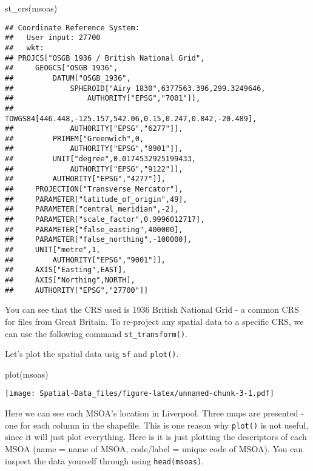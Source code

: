 \documentclass[
]{book}
\newenvironment{Shaded}{\begin{snugshade}}{\end{snugshade}}
\newcommand{\FunctionTok}[1]{\textcolor[rgb]{0.00,0.00,0.00}{#1}}
\newcommand{\NormalTok}[1]{#1}
\begin{document}
\begin{Shaded}
\begin{Highlighting}[]
\FunctionTok{st\_crs}\NormalTok{(msoas)}
\end{Highlighting}
\end{Shaded}

\begin{verbatim}
## Coordinate Reference System:
##   User input: 27700 
##   wkt:
## PROJCS["OSGB 1936 / British National Grid",
##     GEOGCS["OSGB 1936",
##         DATUM["OSGB_1936",
##             SPHEROID["Airy 1830",6377563.396,299.3249646,
##                 AUTHORITY["EPSG","7001"]],
##             TOWGS84[446.448,-125.157,542.06,0.15,0.247,0.842,-20.489],
##             AUTHORITY["EPSG","6277"]],
##         PRIMEM["Greenwich",0,
##             AUTHORITY["EPSG","8901"]],
##         UNIT["degree",0.0174532925199433,
##             AUTHORITY["EPSG","9122"]],
##         AUTHORITY["EPSG","4277"]],
##     PROJECTION["Transverse_Mercator"],
##     PARAMETER["latitude_of_origin",49],
##     PARAMETER["central_meridian",-2],
##     PARAMETER["scale_factor",0.9996012717],
##     PARAMETER["false_easting",400000],
##     PARAMETER["false_northing",-100000],
##     UNIT["metre",1,
##         AUTHORITY["EPSG","9001"]],
##     AXIS["Easting",EAST],
##     AXIS["Northing",NORTH],
##     AUTHORITY["EPSG","27700"]]
\end{verbatim}

You can see that the CRS used is 1936 British National Grid - a common CRS for files from Great Britain. To re-project any spatial data to a specific CRS, we can use the following command \texttt{st\_transform()}.

Let's plot the spatial data usig \texttt{sf} and \texttt{plot()}.

\begin{Shaded}
\begin{Highlighting}[]
\FunctionTok{plot}\NormalTok{(msoas)}
\end{Highlighting}
\end{Shaded}

\texttt{[image: Spatial-Data\_files/figure-latex/unnamed-chunk-3-1.pdf]}

Here we can see each MSOA's location in Liverpool. Three maps are presented - one for each column in the shapefile. This is one reason why \texttt{plot()} is not useful, since it will just plot everything. Here is it is just plotting the descriptors of each MSOA (name = name of MSOA, code/label = unique code of MSOA). You can inspect the data yourself through using \texttt{head(msoas)}.
\end{document}
